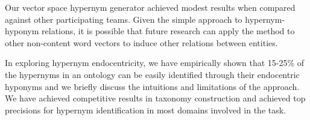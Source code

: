 Our vector space hypernym generator achieved modest results when compared against other participating teams. Given the simple approach to hypernym-hyponym relations, it is possible that future research can apply the method to other non-content word vectors to induce other relations between entities. 

In exploring hypernym endocentricity, we have empirically shown that 15-25\% of the hypernyms in an ontology can be easily identified through their endocentric hyponyms and we briefly discuss the intuitions and limitations of the approach. We have achieved competitive results in taxonomy construction and achieved top precisions for hypernym identification in most domains involved in the task.